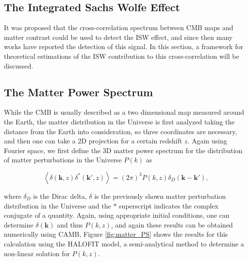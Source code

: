 \documentclass[openany,a4paper,12pt,oneside]{book}
\newcommand{\av}[1]{\left\langle #1 \right\rangle} %
\begin{document}
\begin{spacing}{1.5}
\section{The Integrated Sachs Wolfe Effect}\label{ch2:ISW_effect_section}

It was proposed that the cross-correlation spectrum between CMB maps and matter contrast could be used to detect the ISW effect\cite{Turok96}, and since then many works have reported the detection of this signal\cite{cross_corr:Afshordi, cross_corr:Crittenden2005a, cross_corr:Crittenden2005b, cross_corr:Planck}. In this section, a framework for theoretical estimations of the ISW contribution to this cross-correlation will be discussed.

\subsection{The Matter Power Spectrum}

While the CMB is usually described as a two dimensional map measured around the Earth, the matter distribution in the Universe is first analyzed taking the distance from the Earth into consideration, so three coordinates are necessary, and then one can take a 2D projection for a certain redshift $z$. Again using Fourier space, we first define the 3D matter power spectrum for the distribution of matter perturbations in the Universe $P(k)$ as

\begin{equation}\label{def:P(k)}
    \av{\delta(\mathbf{k}, z) \delta^*(\mathbf{k}', z)}=(2\pi)^3 P(k,z) \delta_D(\mathbf{k}-\mathbf{k}'),
\end{equation}

\noindent where $\delta_D$ is the Dirac delta, $\delta$ is the previously shown matter perturbation distribution in the Universe and the $*$ superscript indicates the complex conjugate of a quantity. Again, using appropriate initial conditions, one can determine $\delta(\mathbf{k})$ and thus $P(k,z)$, and again these results can be obtained numerically using CAMB, Figure \ref{fig:matter_PS} shows the results for this calculation using the HALOFIT model\cite{Halofit2020}, a semi-analytical method to determine a non-linear solution for $P(k,z)$.  


\end{spacing}
\end{document}
